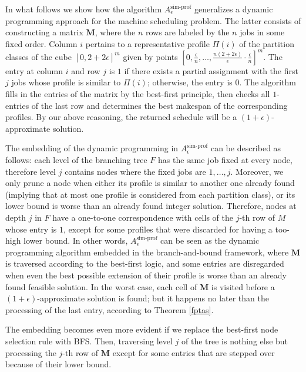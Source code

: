 \documentclass[a4paper,UKenglish,cleveref, autoref, thm-restate, pdfa]{lipics-v2021}
\theoremstyle{plain}
\begin{document}
In what follows we show how the algorithm $A^{\text{sim-prof}}_{\epsilon}$ generalizes a dynamic programming approach for the machine scheduling problem. The latter consists of constructing a matrix $\bm{M}$, where the $n$ rows are labeled by the $n$ jobs in some fixed order. Column $i$ pertains to a representative profile $\Pi(i)$ of the partition classes of the cube $[0,2+2\epsilon]^m$ given by points $[0, \frac{\epsilon}{n}, \ldots, \frac{n(2+2\epsilon)}{\epsilon}\cdot \frac{\epsilon}{n}]^m$. The entry at column $i$ and row $j$ is $1$ if there exists a partial assignment with the first $j$ jobs whose profile is similar to $\Pi(i)$; otherwise, the entry is $0$. The algorithm fills in the entries of the matrix by the best-first principle, then checks all $ 1$-entries of the last row and determines the best makespan of the corresponding profiles. By our above reasoning, the returned schedule will be a $(1+\epsilon)$-approximate solution.

The embedding of the dynamic programming in $A^{\text{sim-prof}}_{\epsilon}$ can be described as follows: each level of the branching tree $F$ has the same job fixed at every node, therefore level $j$ contains nodes where the fixed jobs are $1,\ldots, j$. Moreover, we only prune a node when either its profile is similar to another one already found (implying that at most one profile is considered from each partition class), or its lower bound is worse than an already found integer solution. Therefore, nodes at depth $j$ in $F$ have a one-to-one correspondence with cells of the $j$-th row of $M$ whose entry is $1$, except for some profiles that were discarded for having a too-high lower bound. In other words, $A^{\text{sim-prof}}_{\epsilon}$ can be seen as the dynamic programming algorithm embedded in the branch-and-bound framework, where $\bm{M}$ is traversed according to the best-first logic, and some entries are disregarded when even the best possible extension of their profile is worse than an already found feasible solution. In the worst case, each cell of $\bm{M}$ is visited before a $(1+\epsilon)$-approximate solution is found; but it happens no later than the processing of the last entry, according to Theorem \ref{fptas}.

The embedding becomes even more evident if we replace the best-first node selection rule with BFS. Then, traversing level $j$ of the tree is nothing else but processing the $j$-th row of $\bm{M}$ except for some entries that are stepped over because of their lower bound.
\end{document}
